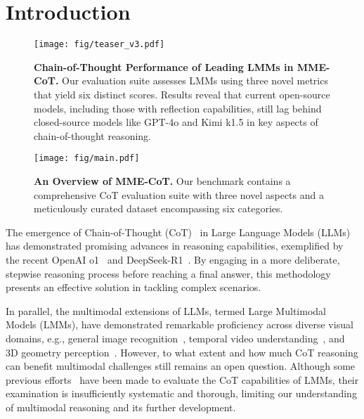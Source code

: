 \section{Introduction}
\label{submission}

\begin{figure}[t!]
    \centering
    \texttt{[image: fig/teaser\_v3.pdf]}
    \caption{\textbf{Chain-of-Thought Performance of Leading LMMs in MME-CoT.} Our evaluation suite assesses LMMs using three novel metrics that yield six distinct scores. Results reveal that current open-source models, including those with reflection capabilities, still lag behind closed-source models like GPT-4o and Kimi k1.5 in key aspects of chain-of-thought reasoning.}
    \label{fig:teaser}
\end{figure}

\begin{figure*}[!t]
\centering
\texttt{[image: fig/main.pdf]} 
\caption{\textbf{An Overview of MME-CoT.} Our benchmark contains a comprehensive CoT evaluation suite with three novel aspects and a meticulously curated dataset encompassing six categories.}
\label{fig:demo1}
\vspace{-0.17cm}
\end{figure*}

The emergence of Chain-of-Thought (CoT)~\cite{wei2022chain} in Large Language Models (LLMs) has demonstrated promising advances in reasoning capabilities, exemplified by the recent OpenAI o1~\cite{o1} and DeepSeek-R1~\cite{guo2025deepseek}. By engaging in a more deliberate, stepwise reasoning process before reaching a final answer, this methodology presents an effective solution in tackling complex scenarios.

In parallel, the multimodal extensions of LLMs, termed Large Multimodal Models (LMMs), have demonstrated remarkable proficiency across diverse visual domains, e.g., general image recognition~\cite{zhang2023llava,zhu2023minigpt, openai2023gpt4v,zhang2024llama}, temporal video understanding~\cite{li2023videochat,chen2023videollm}, and 3D geometry perception~\cite{guo2024sam2point, xu2023pointllm,guo2023point,jia2024lift3d}. However, to what extent and how much CoT reasoning can benefit multimodal challenges still remains an open question. Although some previous efforts~\cite{zhang2024mathverse, yu2023mm,zhang2024mavis,guo2025can} have been made to evaluate the CoT capabilities of LMMs, their examination is insufficiently systematic and thorough, limiting our understanding of multimodal reasoning and its further development.

